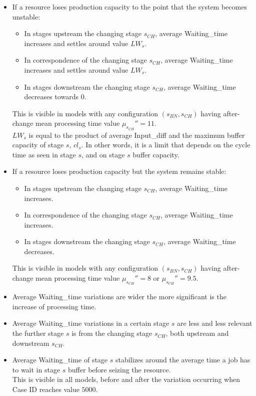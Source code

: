 \begin{itemize}
\item If a resource loses production capacity to the point that the system becomes unstable:
\begin{itemize}
\item In stages upstream the changing stage $s_{CH}$, average Waiting\_time increases and settles around value $LW_s$.
\item In correspondence of the changing stage $s_{CH}$, average Waiting\_time increases and settles around value $LW_s$.
\item In stages downstream the changing stage $s_{CH}$, average Waiting\_time decreases towards $0$.
\end{itemize}
This is visible in models with any configuration $(s_{BN},s_{CH})$ having after-change mean processing time value $\mu_{s_{CH}}''=11$.\\
$LW_s$ is equal to the product of average Input\_diff and the maximum buffer capacity of stage $s$, $cl_s$. In other words, it is a limit that depends on the cycle time as seen in stage $s$, and on stage $s$ buffer capacity. 
\item If a resource loses production capacity but the system remains stable:
\begin{itemize}
\item In stages upstream the changing stage $s_{CH}$, average Waiting\_time increases.
\item In correspondence of the changing stage $s_{CH}$, average Waiting\_time increases.
\item In stages downstream the changing stage $s_{CH}$, average Waiting\_time decreases.
\end{itemize}
This is visible in models with any configuration $(s_{BN},s_{CH})$ having after-change mean processing time value $\mu_{s_{CH}}''=8$ or $\mu_{s_{CH}}''=9.5$.
\item Average Waiting\_time variations are wider the more significant is the increase of processing time.
\item Average Waiting\_time variations in a certain stage $s$ are less and less relevant the further stage $s$ is from the changing stage $s_{CH}$, both upstream and downstream $s_{CH}$. 
\item Average Waiting\_time of stage $s$ stabilizes around the average time a job has to wait in stage $s$ buffer before seizing the resource. \\This is visible in all models, before and after the variation occurring when Case ID reaches value $5000$.
\end{itemize}
